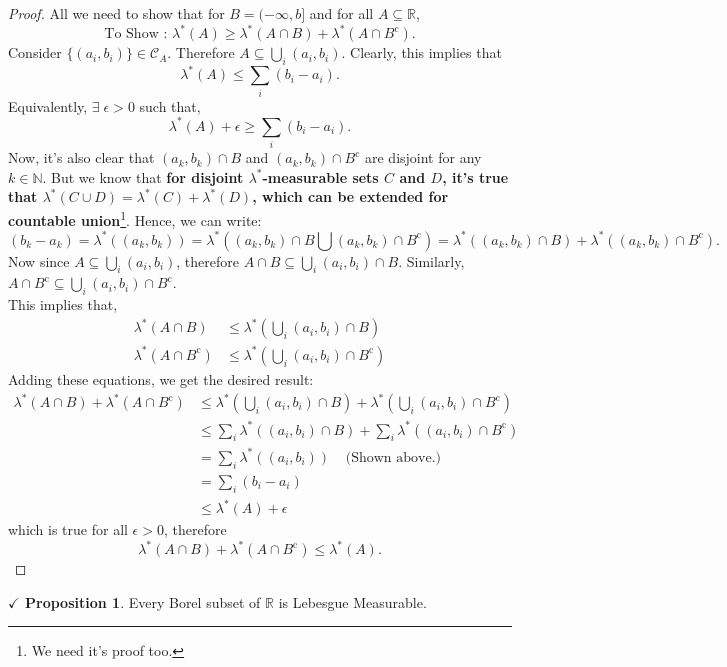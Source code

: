 \documentclass{article}
\theoremstyle{definition}
\theoremstyle{remark}
\theoremstyle{definition}
\theoremstyle{definition}
\newtheorem{proposition}{$\checkmark$ Proposition}
\theoremstyle{definition}
\newcommand{\union}{\cup}
\newcommand{\intrs}{\cap}
\newcommand{\bunion}{\bigcup}
\newcommand{\R}{\mathbb{R}}
\newcommand{\N}{\mathbb{N}}
\newcommand{\comp}[1]{#1^{\text{c}}}
\newcommand{\lom}[1]{\lambda^*\left (#1\right )}
\newcommand{\set}[1]{\mathscr{#1}}
\begin{document}
\begin{proof}
	All we need to show that for $ B= (-\infty, b] $ and for all $ A\subseteq \R $, 
	\[\text{To Show : } \lom{A} \ge \lom{A\intrs B} + \lom{A\intrs \comp{B}}.\]
	Consider $ \{(a_i,b_i)\} \in \set{C}_A $. Therefore $ A \subseteq \bunion_i (a_i,b_i) $. Clearly, this implies that 
	\[\lom{A} \le \sum_i (b_i-a_i).\]
	Equivalently, $ \exists \;\epsilon >0 $ such that,
	\[ \lom{A} + \epsilon \ge \sum_i (b_i-a_i). \]
	Now, it's also clear that $ (a_k,b_k)\intrs B $ and $ (a_k,b_k) \intrs \comp{B}$ are disjoint for any $ k\in\N $. But we know that \textbf{for disjoint $ \lambda^{*} $-measurable sets $ C $ and $ D $, it's true that $ \lom{C\union D} = \lom{C} + \lom{D} $, which can be extended for countable union}\footnote{We need it's proof too.}. Hence, we can write:
	\[(b_k - a_k) = \lom{(a_k,b_k)} = \lom{(a_k,b_k)\intrs B \bunion (a_k,b_k)\intrs \comp{B}} = \lom{(a_k,b_k)\intrs B} + \lom{(a_k,b_k)\intrs \comp{B}}.\]
	Now since $ A\subseteq \bunion_i (a_i,b_i) $, therefore $ A\intrs B \subseteq \bunion_i (a_i,b_i)\intrs B $. Similarly, $ A\intrs \comp{B} \subseteq \bunion_i (a_i,b_i)\intrs \comp{B} $.\\
	This implies that,
	\begin{equation*}
		\begin{split}
			\lom{A\intrs B}&\le \lom{\bunion_i (a_i,b_i)\intrs B}\\
			\lom{A\intrs \comp{B}} &\le \lom{\bunion_i (a_i,b_i)\intrs \comp{B}}
		\end{split}
	\end{equation*}
Adding these equations, we get the desired result:
\begin{equation*}
	\begin{split}
		\lom{A\intrs B} + \lom{A\intrs \comp{B}} &\le \lom{\bunion_i (a_i,b_i)\intrs B} + \lom{\bunion_i (a_i,b_i)\intrs \comp{B}}\\
		&\le \sum_i \lom{(a_i,b_i)\intrs B}+\sum_i \lom{(a_i,b_i)\intrs \comp{B}}\\
		&= \sum_i \lom{(a_i,b_i)}\;\;\;\;\text{(Shown above.)}\\
		&= \sum_i (b_i-a_i)\\
		&\le \lom{A} + \epsilon
	\end{split}
\end{equation*}
which is true for all $ \epsilon >0 $, therefore 
\[\lom{A\intrs B} + \lom{A\intrs \comp{B}} \le \lom{A}.\]
\end{proof}
\hrulefill
\begin{proposition}\label{P-12}
	Every Borel subset of $ \R $ is Lebesgue Measurable.
\end{proposition}
\end{document}
